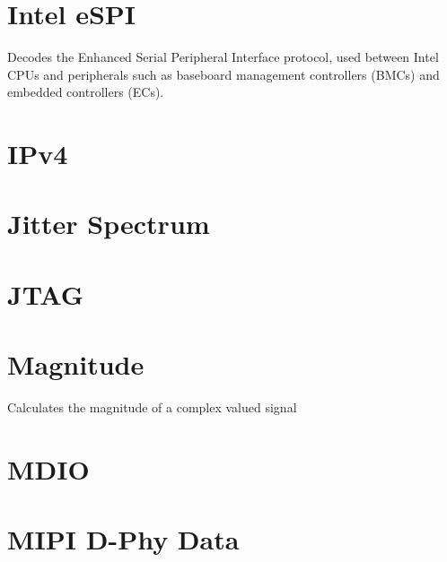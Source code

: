 \section{Intel eSPI}

Decodes the Enhanced Serial Peripheral Interface protocol, used between Intel CPUs and peripherals such as baseboard
management controllers (BMCs) and embedded controllers (ECs).

\pagebreak
\section{IPv4}

\pagebreak
\section{Jitter Spectrum}

\pagebreak
\section{JTAG}

\pagebreak
\section{Magnitude}

Calculates the magnitude of a complex valued signal

\pagebreak
\section{MDIO}

\pagebreak
\section{MIPI D-Phy Data}

